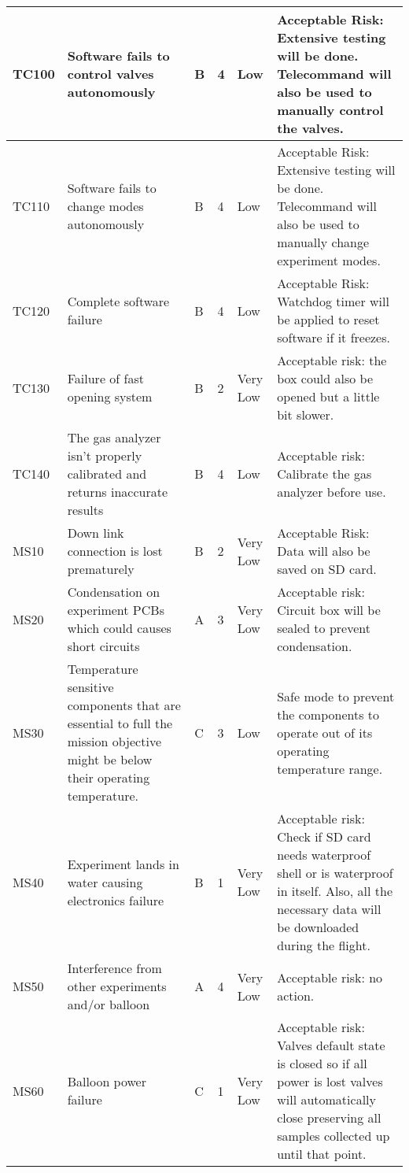 \begin{longtable}{|m{}| m{} |m{} |m{}|m{}| m{}|}
TC100 & Software fails to control valves autonomously & B & 4 & \cellcolor[HTML]{FCFF2F}Low & Acceptable Risk: Extensive testing will be done. Telecommand will also be used to manually control the valves. \\ \hline
TC110 & Software fails to change modes autonomously & B & 4 & \cellcolor[HTML]{FCFF2F}Low & Acceptable Risk: Extensive testing will be done. Telecommand will also be used to manually change experiment modes. \\ \hline
TC120 & Complete software failure & B & 4 & \cellcolor[HTML]{FCFF2F}Low & Acceptable Risk: Watchdog timer will be applied to reset software if it freezes. \\ \hline
TC130 & Failure of fast opening system & B & 2 & \cellcolor[HTML]{34FF34}Very Low & Acceptable risk: the box could also be opened but a little bit slower. \\ \hline
TC140 & The gas analyzer isn't properly calibrated and returns inaccurate results & B & 4 & \cellcolor[HTML]{FCFF2F}Low & Acceptable risk: Calibrate the gas analyzer before use.\\ \hline
MS10 & Down link connection is lost prematurely & B & 2 & \cellcolor[HTML]{34FF34}Very Low & Acceptable Risk: Data will also be saved on SD card. \\ \hline
MS20 & Condensation on experiment PCBs which could causes short circuits & A & 3 & \cellcolor[HTML]{34FF34}Very Low & Acceptable risk: Circuit box will be sealed to prevent condensation. \\ \hline
MS30 & Temperature sensitive components that are essential to full the mission objective might be below their operating temperature. & C & 3 & \cellcolor[HTML]{FCFF2F}Low & Safe mode to prevent the components to operate out of its operating temperature range. \\ \hline
MS40 & Experiment lands in water causing electronics failure & B & 1 & \cellcolor[HTML]{34FF34}Very Low & Acceptable risk: Check if SD card needs waterproof shell or is waterproof in itself. Also, all the necessary data will be downloaded during the flight. \\ \hline
MS50 & Interference from other experiments and/or balloon & A & 4 & \cellcolor[HTML]{34FF34}Very Low & Acceptable risk: no action. \\ \hline
MS60 & Balloon power failure & C & 1 & \cellcolor[HTML]{34FF34}Very Low & Acceptable risk: Valves default state is closed so if all power is lost valves will automatically close preserving all samples collected up until that point. \\ \hline

\end{longtable}
